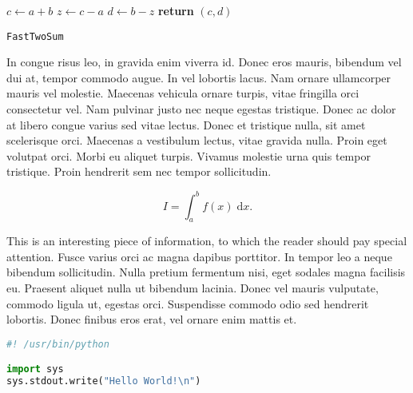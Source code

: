 \documentclass{article}
\begin{document}
\begin{center}
	\begin{minipage}{0.5\linewidth} %
		\begin{algorithm}[H]
			\medskip
			$c \leftarrow a + b$ \;
			$z \leftarrow c - a$ \;
			$d \leftarrow b - z$ \;
			{\bf return} $(c,d)$ \;
			\caption{\texttt{FastTwoSum}} %
			\label{alg:fastTwoSum}   %
		\end{algorithm}
	\end{minipage}
\end{center}

\begin{question}
	In congue risus leo, in gravida enim viverra id. Donec eros mauris, bibendum vel dui at, tempor commodo augue. In vel lobortis lacus. Nam ornare ullamcorper mauris vel molestie. Maecenas vehicula ornare turpis, vitae fringilla orci consectetur vel. Nam pulvinar justo nec neque egestas tristique. Donec ac dolor at libero congue varius sed vitae lectus. Donec et tristique nulla, sit amet scelerisque orci. Maecenas a vestibulum lectus, vitae gravida nulla. Proin eget volutpat orci. Morbi eu aliquet turpis. Vivamus molestie urna quis tempor tristique. Proin hendrerit sem nec tempor sollicitudin.
\end{question}

\begin{equation}
	I = \int_{a}^{b} f(x) \; \text{d}x.
\end{equation}

\begin{info} %
	This is an interesting piece of information, to which the reader should pay special attention. Fusce varius orci ac magna dapibus porttitor. In tempor leo a neque bibendum sollicitudin. Nulla pretium fermentum nisi, eget sodales magna facilisis eu. Praesent aliquet nulla ut bibendum lacinia. Donec vel mauris vulputate, commodo ligula ut, egestas orci. Suspendisse commodo odio sed hendrerit lobortis. Donec finibus eros erat, vel ornare enim mattis et.
\end{info}

\begin{file}[hello.py]
\begin{lstlisting}[language=Python]
#! /usr/bin/python

import sys
sys.stdout.write("Hello World!\n")
\end{lstlisting}
\end{file}
\end{document}
